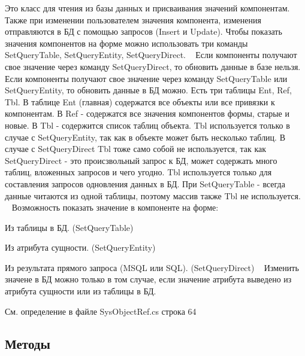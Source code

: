 Это класс для чтения из базы данных и присваивания значений компонентам. Также при изменении пользователем значения компонента, изменения отправляются в БД с помощью запросов (Insert и Update). Чтобы показать значения компонентов на форме можно использовать три команды Set\+Query\+Table, Set\+Query\+Entity, Set\+Query\+Direct. ~\newline
Если компоненты получают свое значение через команду Set\+Query\+Direct, то обновить данные в базе нельзя. Если компоненты получают свое значение через команду Set\+Query\+Table или Set\+Query\+Entity, то обновить данные в БД можно. Есть три таблицы Ent, Ref, Tbl. В таблице Ent (главная) содержатся все объекты или все привязки к компонентам. В Ref -\/ содержатся все значения компонентов формы, старые и новые. В Tbl -\/ содержится список таблиц объекта. Tbl используется только в случае с Set\+Query\+Entity, так как в объекте может быть несколько таблиц. В случае с Set\+Query\+Direct Tbl тоже само собой не используется, так как Set\+Query\+Direct -\/ это происзвольный запрос к БД, может содержать много таблиц, вложенных запросов и чего угодно. Tbl используется только для составления запросов одновления данных в БД. При Set\+Query\+Table -\/ всегда данные читаются из одной таблицы, поэтому массив также Tbl не используется. ~\newline
Возможность показать значение в компоненте на форме\+:
\begin{DoxyEnumerate}
\item Из таблицы в БД. (Set\+Query\+Table)
\item Из атрибута сущности. (Set\+Query\+Entity)
\item Из результата прямого запроса (M\+S\+QL или S\+QL). (Set\+Query\+Direct) ~\newline
Изменить значене в БД можно только в том случае, если значение атрибута выведено из атрибута сущности или из таблицы в БД. ~\newline

\end{DoxyEnumerate}

См. определение в файле Sys\+Object\+Ref.\+cs строка 64



\subsection{Методы}
\mbox{\label{class_f_b_a_1_1_object_ref_a1a4bb51c6ca978071882d8a46ee45ba0}} 
